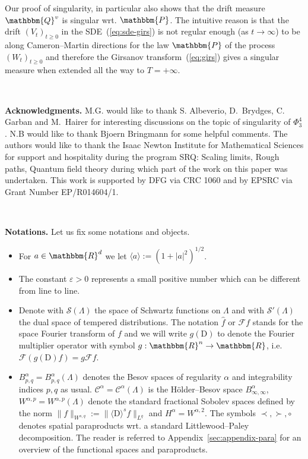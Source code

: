 \documentclass[11pt]{article}
\newcommand{\assign}{:=}
\newcommand{\mathD}{\mathrm{D}}
\newcommand{\tmtextbf}[1]{{\bfseries{#1}}}
\newenvironment{itemizedot}{\begin{itemize} \renewcommand{\labelitemi}{$\bullet$}\renewcommand{\labelitemii}{$\bullet$}\renewcommand{\labelitemiii}{$\bullet$}\renewcommand{\labelitemiv}{$\bullet$}}{\end{itemize}}
\newcommand{\VV}{\mathscr{C}}
\newcommand{\CF}{\mathscr{F}}
\newcommand{\CS}{\mathscr{S}}
\begin{document}
Our proof of singularity, in particular also shows that the drift measure
$\mathbbm{Q}^v$ is singular wrt. $\mathbbm{P}$. The intuitive reason is that
the drift $(V_t)_{t \geqslant 0}$ in the SDE~(\ref{eq:sde-girs}) is not
regular enough (as $t \rightarrow \infty$) to be along Cameron--Martin
directions for the law $\mathbbm{P}$ of the process $(W_t)_{t \geqslant 0}$
and therefore the Girsanov transform~(\ref{eq:girs}) gives a singular measure
when extended all the way to $T = + \infty$.

\



{\noindent}\tmtextbf{Acknowledgments.} M.G. would like to thank S. Albeverio,
D.~Brydges, C. Garban and M.~Hairer for interesting discussions on the topic
of singularity of $\Phi^4_3$. N.B would like to thank Bjoern Bringmann for
some helpful comments. The authors would like to thank the Isaac Newton
Institute for Mathematical Sciences for support and hospitality during the
program SRQ: Scaling limits, Rough paths, Quantum field theory during which
part of the work on this paper was undertaken. This work is supported by DFG
via CRC 1060 and by EPSRC via Grant Number EP/R014604/1.

\

{\noindent}\tmtextbf{Notations.} Let us fix some notations and objects.
\begin{itemizedot}
  \item For $a \in \mathbbm{R}^d$ we let $\langle a \rangle \assign (1 + | a
  |^2)^{1 / 2}$.
  
  \item The constant $\varepsilon > 0$ represents a small positive number
  which can be different from line to line.
  
  \item Denote with $\CS (\Lambda)$ the space of Schwartz functions on
  $\Lambda$ and with $\CS' (\Lambda)$ the dual space of tempered
  distributions. The notation $\hat{f}$ or $\CF f$ stands for the space
  Fourier transform of $f$ and we will write $g (\mathD)$ to denote the
  Fourier multiplier operator with symbol $g : \mathbbm{R}^n \rightarrow
  \mathbbm{R}$, i.e. $\CF (g (\mathD) f) = g \CF f$.
  
  \item $B^{\alpha}_{p, q} = B^{\alpha}_{p, q} (\Lambda)$ denotes the Besov
  spaces of regularity $\alpha$ and integrability indices $p, q$ as usual.
  $\VV^{\alpha} = \VV^{\alpha} (\Lambda)$ is the H{\"o}lder--Besov space
  $B^{\alpha}_{\infty, \infty}$, $W^{\alpha, p} = W^{\alpha, p} (\Lambda)$
  denote the standard fractional Sobolev spaces defined by the norm $\| f
  \|_{W^{s, q}} \assign \| \langle \mathD \rangle^s f \|_{L^q}$ and
  $H^{\alpha} = W^{\alpha, 2}$. The symbols $\prec, \succ, \circ$ denotes
  spatial paraproducts wrt. a standard Littlewood--Paley decomposition. The
  reader is referred to Appendix~\ref{sec:appendix-para} for an overview of
  the functional spaces and paraproducts.
\end{itemizedot}
\end{document}
